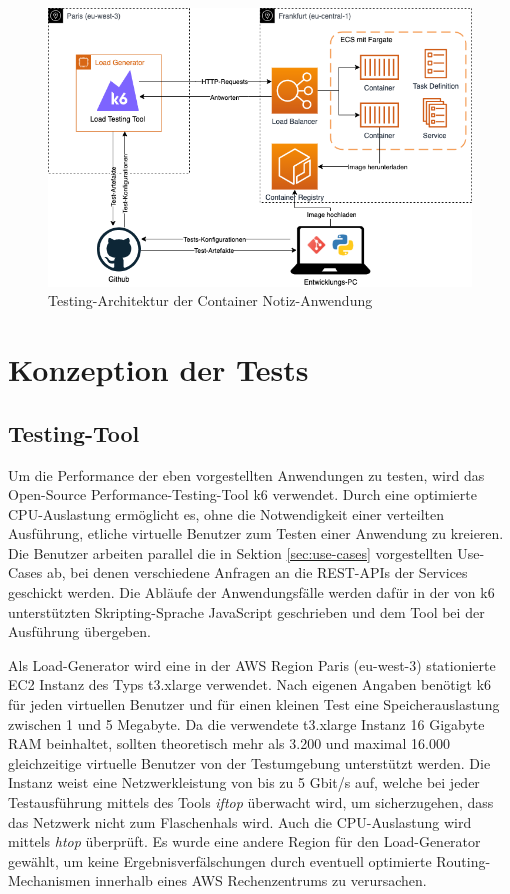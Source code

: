 \begin{figure}
    \includegraphics[width=\textwidth]{img/fargate-testing-architektur.png}
    \caption[Testing-Architektur der Container Notiz-Anwendung]{Testing-Architektur der Container Notiz-Anwendung}
    \label{fig:fargate-testing-architektur}
\end{figure}

\section{Konzeption der Tests}

\subsection{Testing-Tool}
Um die Performance der eben vorgestellten Anwendungen zu testen, wird das Open-Source Performance-Testing-Tool k6 \cite{noauthor_load_nodate} verwendet. Durch eine optimierte CPU-Auslastung ermöglicht es, ohne die Notwendigkeit einer verteilten Ausführung, etliche virtuelle Benutzer zum Testen einer Anwendung zu kreieren\cite{noauthor_running_nodate}. Die Benutzer arbeiten parallel die in Sektion \ref{sec:use-cases} vorgestellten Use-Cases ab, bei denen verschiedene Anfragen an die REST-APIs der Services geschickt werden. Die Abläufe der Anwendungsfälle werden dafür in der von k6 unterstützten Skripting-Sprache JavaScript geschrieben und dem Tool bei der Ausführung übergeben.

Als Load-Generator wird eine in der \ac{AWS} Region Paris (eu-west-3) stationierte \ac{EC2} Instanz des Typs t3.xlarge verwendet.
Nach eigenen Angaben benötigt k6 für jeden virtuellen Benutzer und für einen kleinen Test eine Speicherauslastung zwischen 1 und 5 Megabyte\cite{noauthor_running_nodate}. Da die verwendete t3.xlarge Instanz 16 Gigabyte RAM beinhaltet, sollten theoretisch mehr als 3.200 und maximal 16.000 gleichzeitige virtuelle Benutzer von der Testumgebung unterstützt werden. Die Instanz weist eine Netzwerkleistung von bis zu 5 Gbit/s auf, welche bei jeder Testausführung mittels des Tools \textit{iftop} überwacht wird, um sicherzugehen, dass das Netzwerk nicht zum Flaschenhals wird. Auch die CPU-Auslastung wird mittels \textit{htop} überprüft. Es wurde eine andere Region für den Load-Generator gewählt, um keine Ergebnisverfälschungen durch eventuell optimierte Routing-Mechanismen innerhalb eines \ac{AWS} Rechenzentrums zu verursachen.


